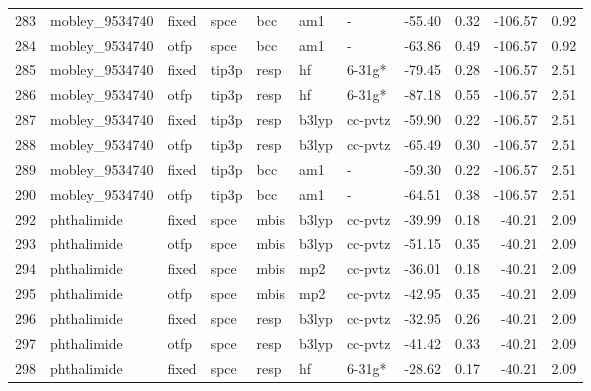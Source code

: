 \begin{tabular}{lllllllrrrr}
283 &                mobley\_9534740 &  fixed &   spce &    bcc &     am1 &            - &      -55.40 &     0.32 &     -106.57 &      0.92 \\
284 &                mobley\_9534740 &   otfp &   spce &    bcc &     am1 &            - &      -63.86 &     0.49 &     -106.57 &      0.92 \\
285 &                mobley\_9534740 &  fixed &  tip3p &   resp &      hf &       6-31g* &      -79.45 &     0.28 &     -106.57 &      2.51 \\
286 &                mobley\_9534740 &   otfp &  tip3p &   resp &      hf &       6-31g* &      -87.18 &     0.55 &     -106.57 &      2.51 \\
287 &                mobley\_9534740 &  fixed &  tip3p &   resp &   b3lyp &      cc-pvtz &      -59.90 &     0.22 &     -106.57 &      2.51 \\
288 &                mobley\_9534740 &   otfp &  tip3p &   resp &   b3lyp &      cc-pvtz &      -65.49 &     0.30 &     -106.57 &      2.51 \\
289 &                mobley\_9534740 &  fixed &  tip3p &    bcc &     am1 &            - &      -59.30 &     0.22 &     -106.57 &      2.51 \\
290 &                mobley\_9534740 &   otfp &  tip3p &    bcc &     am1 &            - &      -64.51 &     0.38 &     -106.57 &      2.51 \\
292 &                   phthalimide &  fixed &   spce &   mbis &   b3lyp &      cc-pvtz &      -39.99 &     0.18 &      -40.21 &      2.09 \\
293 &                   phthalimide &   otfp &   spce &   mbis &   b3lyp &      cc-pvtz &      -51.15 &     0.35 &      -40.21 &      2.09 \\
294 &                   phthalimide &  fixed &   spce &   mbis &     mp2 &      cc-pvtz &      -36.01 &     0.18 &      -40.21 &      2.09 \\
295 &                   phthalimide &   otfp &   spce &   mbis &     mp2 &      cc-pvtz &      -42.95 &     0.35 &      -40.21 &      2.09 \\
296 &                   phthalimide &  fixed &   spce &   resp &   b3lyp &      cc-pvtz &      -32.95 &     0.26 &      -40.21 &      2.09 \\
297 &                   phthalimide &   otfp &   spce &   resp &   b3lyp &      cc-pvtz &      -41.42 &     0.33 &      -40.21 &      2.09 \\
298 &                   phthalimide &  fixed &   spce &   resp &      hf &       6-31g* &      -28.62 &     0.17 &      -40.21 &      2.09 \\

\end{tabular}
